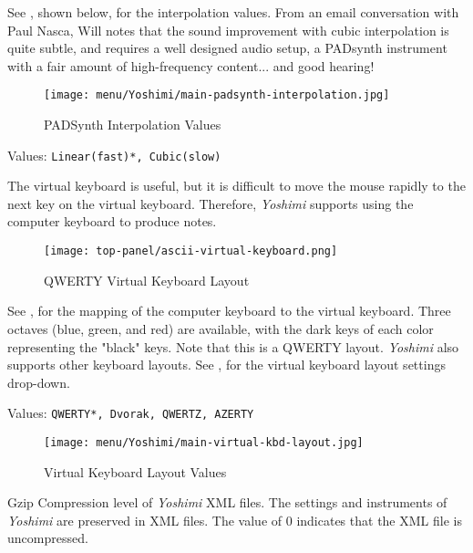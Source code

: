    See , shown below,
   for the interpolation values.
   From an email conversation with Paul Nasca, Will notes that
   the sound improvement with cubic interpolation is quite subtle, and requires
   a well designed audio setup, a PADsynth instrument with a fair amount of
   high-frequency content... and good hearing!

\begin{figure}[H]
   \centering 
   \texttt{[image: menu/Yoshimi/main-padsynth-interpolation.jpg]}
   \caption[PADSynth Interpolation]{PADSynth Interpolation Values}
   \label{fig:padsynth_interpolation}
\end{figure}

   Values: \texttt{Linear(fast)*, Cubic(slow)}

   The virtual keyboard is useful, but it is difficult to move the mouse
   rapidly to the next key on the virtual keyboard.
   Therefore, \textsl{Yoshimi} supports using the computer keyboard
   to produce notes.

\begin{figure}[H]
   \centering 
   \texttt{[image: top-panel/ascii-virtual-keyboard.png]}
   \caption{QWERTY Virtual Keyboard Layout}
   \label{fig:qwerty_virtual_keyboard}
\end{figure}

   See ,
   for the mapping of the computer keyboard to the
   virtual keyboard.
   Three octaves (blue, green, and red) are available, with the dark keys of
   each color representing the "black" keys.
   Note that this is a QWERTY layout.  
   \textsl{Yoshimi} also supports other keyboard layouts.
   See ,
   for the virtual keyboard layout settings drop-down.

   Values: \texttt{QWERTY*, Dvorak, QWERTZ, AZERTY}

\begin{figure}[H]
   \centering 
   \texttt{[image: menu/Yoshimi/main-virtual-kbd-layout.jpg]}
   \caption[Virtual Keyboard Layout]{Virtual Keyboard Layout Values}
   \label{fig:virtual_kbd_layout} 
\end{figure}

   Gzip Compression level of \textsl{Yoshimi} XML files.
   The settings and instruments of
   \textsl{Yoshimi}
   are preserved in XML files.
   The value of 0 indicates that the XML file is uncompressed.

